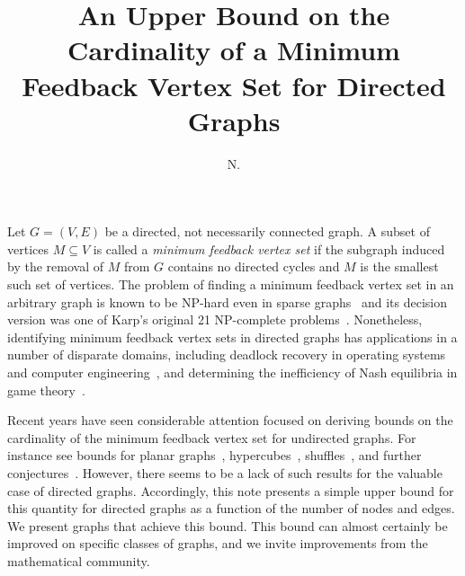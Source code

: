 \documentclass[CRMATH,Unicode,manuscript]{cedram}
\title{An Upper Bound on the Cardinality of a Minimum Feedback Vertex Set for Directed Graphs}
\author{\firstname{Philip} N. \lastname{Brown}\CDRorcid{0000-xxx-0000-yyyy}}
\begin{document}
\maketitle





Let $G=(V,E)$ be a directed, not necessarily connected graph.
A subset of vertices $M\subseteq V$ is called a \emph{minimum feedback vertex set} if the subgraph induced by the removal of $M$ from $G$ contains no directed cycles and $M$ is the smallest such set of vertices.
The problem of finding a minimum feedback vertex set in an arbitrary graph is known to be NP-hard even in sparse graphs~\cite{Fomin2006,Borradaile2019} and its decision version was one of Karp's original 21 NP-complete problems~\cite{Karp1972}.
Nonetheless, identifying minimum feedback vertex sets in directed graphs has applications in a number of disparate domains, including deadlock recovery in operating systems and computer engineering~\cite{Lin2000}, and determining the inefficiency of Nash equilibria in game theory~\cite{Brown2019c}.


Recent years have seen considerable attention focused on deriving bounds on the cardinality of the minimum feedback vertex set for undirected graphs. For instance see bounds for planar graphs~\cite{Kelly2017}, hypercubes~\cite{Madelaine2008}, shuffles~\cite{Kralovic2003}, and further conjectures~\cite{Kowalik2010}.
However, there seems to be a lack of such results for the valuable case of directed graphs.
Accordingly, this note presents a simple upper bound for this quantity for directed graphs as a function of the number of nodes and edges.
We present graphs that achieve this bound.
This bound can almost certainly be improved on specific classes of graphs, and we invite improvements from the mathematical community.
\end{document}
